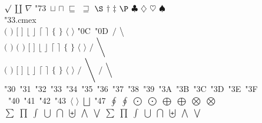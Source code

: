 \documentclass{article}
\begin{document}
$\surd$ $\amalg$ $\nabla$ \selectfont\char"73\  $\sqcup$ $\sqcap$ $\sqsubseteq$ $\sqsupseteq$ $\S$ $\dag$ $\ddag$ $\P$ $\clubsuit$ $\diamondsuit$ $\heartsuit$ $\spadesuit$\\ 
\selectfont\char"33.cmex\\
$\big($ $\big)$ $\big[$ $\big]$ $\big\lfloor$ $\big\rfloor$ $\big\lceil$ $\big\rceil$ $\big\{$ $\big\}$ $\big\langle$ $\big\rangle$ \selectfont\char"0C\  \selectfont\char"0D\ $\big/$ $\big\backslash$\\
$\Big($ $\Big)$ $\bigg($ $\bigg)$ $\bigg[$ $\bigg]$ $\bigg\lfloor$ $\bigg\rfloor$ $\bigg\lceil$ $\bigg\rceil$ $\bigg\{$ $\bigg\}$ $\bigg\langle$ $\bigg\rangle$ $\bigg/$ $\bigg\backslash$\\
$\Bigg($ $\Bigg)$ $\Bigg[$ $\Bigg]$ $\Bigg\lfloor$ $\Bigg\rfloor$ $\Bigg\lceil$ $\Bigg\rceil$ $\Bigg\{$ $\Bigg\}$ $\Bigg\langle$ $\Bigg\rangle$ $\Bigg/$ $\Bigg\backslash$ $\Big/$ $\Big\backslash$\\
 \selectfont\char"30\ \selectfont\char"31\ \selectfont\char"32\ \selectfont\char"33\ \selectfont\char"34\ \selectfont\char"35\ \selectfont\char"36\ \selectfont\char"37\ \selectfont\char"38\ \selectfont\char"39\ \selectfont\char"3A\ \selectfont\char"3B\ \selectfont\char"3C\ \selectfont\char"3D\ \selectfont\char"3E\ \selectfont\char"3F\\\
\selectfont\char"40\ \selectfont\char"41\ \selectfont\char"42\ \selectfont\char"43\ $\Big\langle$ $\Big\rangle$ $\bigsqcup$ \selectfont\char"47\  $\oint$ $\displaystyle\oint$ $\bigodot$ $\displaystyle\bigodot$ $\bigoplus$ $\displaystyle\bigoplus$ $\bigotimes$ $\displaystyle\bigotimes$\\
$\sum$ $\prod$ $\int$ $\bigcup$ $\bigcap$ $\biguplus$ $\bigwedge$ $\bigvee$ $\displaystyle\sum$ $\displaystyle\prod$ $\displaystyle\int$ $\displaystyle\bigcup$ $\displaystyle\bigcap$ $\displaystyle\biguplus$ $\displaystyle\bigwedge$ $\displaystyle\bigvee$\\
\end{document}
